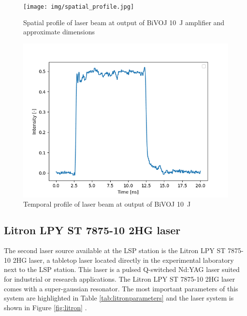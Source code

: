 \begin{figure}[h]
    \centering
    \texttt{[image: img/spatial\_profile.jpg]}
    \caption{Spatial profile of laser beam at output of BiVOJ \SI{10}{\joule} amplifier and approximate dimensions \cite{kaufman}}
    \label{fig:spatialprofile}
\end{figure}

\begin{figure}[h]
    \centering
    \includegraphics[width=0.6\linewidth]{img/temporal_profile_bivoj.png}
    \caption{Temporal profile of laser beam at output of BiVOJ \SI{10}{\joule} \cite{kaufman}}
    \label{fig:temporalprofile}
\end{figure}

\subsection{Litron LPY ST 7875-10 2HG laser}

The second laser source available at the LSP station is the Litron LPY ST 7875-10 2HG laser, a tabletop laser located directly in the experimental laboratory next to the LSP station. This laser is a pulsed Q-switched Nd:YAG laser suited for industrial or research applications. The Litron  LPY ST 7875-10 2HG laser comes with a super-gaussian resonator. The most important parameters of this system are highlighted in Table \ref{tab:litronparameters} and the laser system is shown in Figure \ref{fig:litron} \cite{litron}. 


